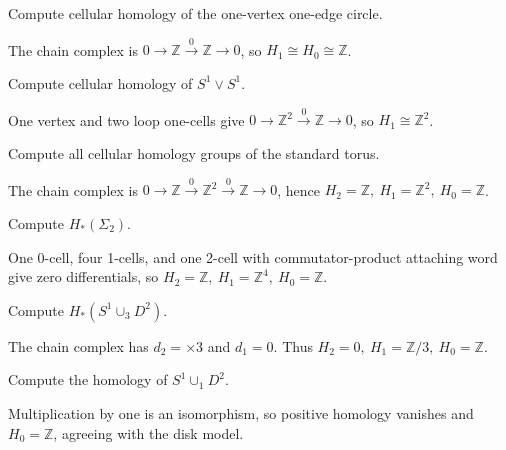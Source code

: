 \begin{problem}[Circle]\label{prob:viii18-02}
Compute cellular homology of the one-vertex one-edge circle.
\end{problem}
\begin{solution}
The chain complex is \(0\to\mathbb Z\xrightarrow0\mathbb Z\to0\), so \(H_1\cong H_0\cong\mathbb Z\).
\end{solution}

\begin{problem}\label{prob:viii18-03}
Compute cellular homology of \(S^1\vee S^1\).
\end{problem}
\begin{solution}
One vertex and two loop one-cells give \(0\to\mathbb Z^2\xrightarrow0\mathbb Z\to0\), so \(H_1\cong\mathbb Z^2\).
\end{solution}

\begin{problem}[Torus]\label{prob:viii18-04}
Compute all cellular homology groups of the standard torus.
\end{problem}
\begin{solution}
The chain complex is \(0\to\mathbb Z\xrightarrow0\mathbb Z^2\xrightarrow0\mathbb Z\to0\), hence \(H_2=\mathbb Z,\ H_1=\mathbb Z^2,\ H_0=\mathbb Z\).
\end{solution}

\begin{problem}\label{prob:viii18-05}
Compute \(H_*(\Sigma_2)\).
\end{problem}
\begin{solution}
One 0-cell, four 1-cells, and one 2-cell with commutator-product attaching word give zero differentials, so \(H_2=\mathbb Z,\ H_1=\mathbb Z^4,\ H_0=\mathbb Z\).
\end{solution}

\begin{problem}\label{prob:viii18-06}
Compute \(H_*(S^1\cup_3D^2)\).
\end{problem}
\begin{solution}
The chain complex has \(d_2=\times3\) and \(d_1=0\). Thus \(H_2=0,\ H_1=\mathbb Z/3,\ H_0=\mathbb Z\).
\end{solution}

\begin{problem}\label{prob:viii18-07}
Compute the homology of \(S^1\cup_1D^2\).
\end{problem}
\begin{solution}
Multiplication by one is an isomorphism, so positive homology vanishes and \(H_0=\mathbb Z\), agreeing with the disk model.
\end{solution}

